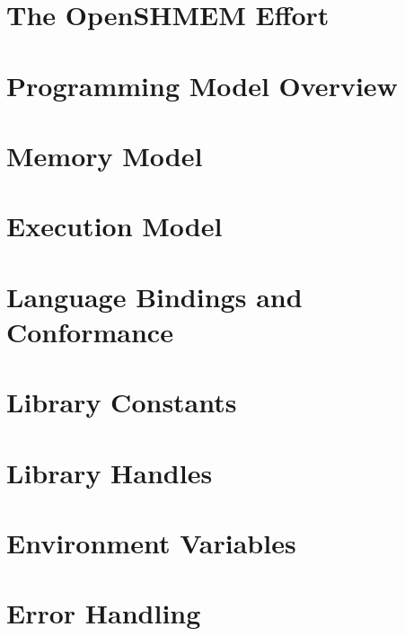 \documentclass[10pt]{book}
\begin{document}




\section{The OpenSHMEM Effort}\label{subsec:openshmem_effort}


\section{Programming Model Overview}\label{subsec:programming_model}


\section{Memory Model}\label{subsec:memory_model}


\section{Execution Model}\label{subsec:execution_model}


\section{Language Bindings and Conformance}\label{subsec:bindings}


\section{Library Constants}\label{subsec:library_constants}


\section{Library Handles}\label{subsec:library_handles}


\section{Environment Variables }\label{subsec:environment_variables}


{\color{Green}
\section{Error Handling}\label{subsec:error_handling}

}
\end{document}

